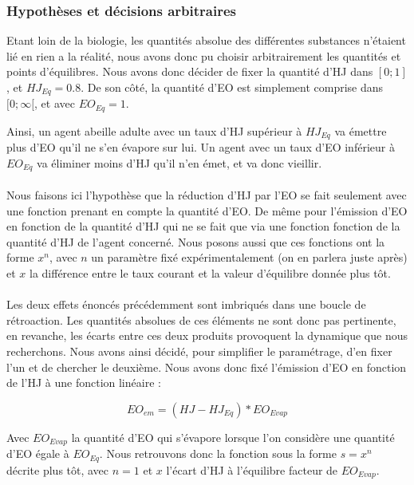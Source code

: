 \documentclass[11pt,a4paper]{report}
\begin{document}
	\subsubsection{Hypothèses et décisions arbitraires}
	Etant loin de la biologie, les quantités absolue des différentes substances n'étaient lié en rien a la réalité, nous avons donc pu choisir arbitrairement les quantités et points d'équilibres. Nous avons donc décider de fixer la quantité d'HJ dans $[0;1]$, et $HJ_{Eq} = 0.8$. De son côté, la quantité d'EO est simplement comprise dans $[0;\infty[$, et avec $EO_{Eq} = 1$. 
	
	Ainsi, un agent abeille adulte avec un taux d'HJ supérieur à $HJ_{Eq}$ va émettre plus d'EO qu'il ne s'en évapore sur lui. Un agent avec un taux d'EO inférieur à $EO_{Eq}$ va éliminer moins d'HJ qu'il n'en émet, et va donc vieillir.
	
	\paragraph{}
	Nous faisons ici l'hypothèse que la réduction d'HJ par l'EO se fait seulement avec une fonction prenant en compte la quantité d'EO. De même pour l'émission d'EO en fonction de la quantité d'HJ qui ne se fait que via une fonction fonction de la quantité d'HJ de l'agent concerné. Nous posons aussi que ces fonctions ont la forme $x^n$, avec $n$ un paramètre fixé expérimentalement (on en parlera juste après) et $x$ la différence entre le taux courant et la valeur d'équilibre donnée plus tôt.
	
	\paragraph{}
	Les deux effets énoncés précédemment sont imbriqués dans une boucle de rétroaction. Les quantités absolues de ces éléments ne sont donc pas pertinente, en revanche, les écarts entre ces deux produits provoquent la dynamique que nous recherchons. Nous avons ainsi décidé, pour simplifier le paramétrage, d'en fixer l'un et de chercher le deuxième. Nous avons donc fixé l'émission d'EO en fonction de l'HJ à une fonction linéaire :
	
	\begin{equation}
		EO_{em} = (HJ - HJ_{Eq}) * EO_{Evap}
	\label{eoEM}
	\end{equation}

Avec $EO_{Evap}$ la quantité d'EO qui s'évapore lorsque l'on considère une quantité d'EO égale à $EO_{Eq}$. Nous retrouvons donc la fonction sous la forme $s=x^n$ décrite plus tôt, avec $n = 1$ et $x$ l'écart d'HJ à l'équilibre facteur de $EO_{Evap}$.
	
\end{document}
